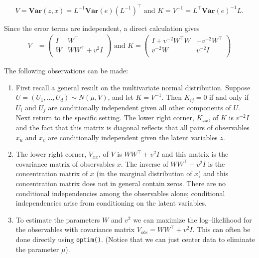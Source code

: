 \begin{equation}
V = \mathbf{Var}(z,x)=L^{-1}\mathbf{Var}(e) (L^{-1})^\top\mbox{ and }
K = V^{-1}= L^\top\mathbf{Var}(e)^{-1}L.
\label{eq:KV}
\end{equation}

Since the error terms are independent, a direct calculation gives
\begin{align}
  \label{eq:ppca1}
  V &= \left(
    \begin{array}{cccccccccccccccccccccccccccccccccccc}
      I & W^\top\\ W & WW^\top+ v^2I \\
    \end{array}
  \right) \mbox{ and }
  K = \left(
    \begin{array}{cccccccccccccccccccccccccccccccccccc}
      I + v^{-2}W^\top W & -v^{-2}W^\top\\ v^{-2}W & v^{-2}I  \\
    \end{array}
  \right)
\end{align}

The following observations can be made:

\begin{enumerate}
\def\labelenumi{\arabic{enumi}.}
\item
  First recall a general result on the multivariate normal distribution.
  Suppose \(U=(U_1, \dots, U_d)\sim N(\mu, V)\), and let \(K=V^{-1}\).
  Then \(K_{ij} = 0\) if and only if \(U_i\) and \(U_j\) are
  conditionally independent given all other components of \(U\). Next
  return to the specific setting. The lower right corner, \(K_{xx}\), of
  \(K\) is \(v^{-2}I\) and the fact that this matrix is diagonal
  reflects that all pairs of observables \(x_u\) and \(x_v\) are
  conditionally independent given the latent variables \(z\).
\item
  The lower right corner, \(V_{xx}\), of \(V\) is \(WW^\top+ v^2I\) and
  this matrix is the covariance matrix of observables \(x\). The inverse
  of \(WW^\top+ v^2I\) is the concentration matrix of \(x\) (in the
  marginal distribution of \(x\)) and this concentration matrix does not
  in general contain zeros. There are no conditional independencies
  among the observables alone; conditional independencies arise from
  conditioning on the latent variables.
\item
  To estimate the parameters \(W\) and \(v^2\) we can maximize the
  log--likelihood for the observables with covariance matrix
  \(V_{obs}=WW^\top+ v^2I\). This can often be done directly using
  \texttt{optim()}. (Notice that we can just center data to eliminate
  the parameter \(\mu\)).
\end{enumerate}

